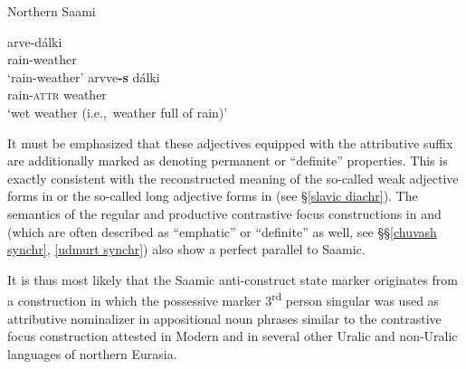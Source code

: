 {%
\begin{exe}
\ex
\begin{xlist}
\ex \rm{Northern Saami \citep[48]{bergsland1976}}
\begin{xlist}
\ex
\gll	arve-dálki\\
	rain-weather\\
\glt	‘rain-weather’
\ex
\gll	arvve\textbf{-s} dálki\\
	rain-\textsc{attr} weather\\
\glt	‘wet weather (i.e.,~weather full of rain)’
\end{xlist}
\end{xlist}
\end{exe}
It must be emphasized that these adjectives equipped with the attributive suffix are additionally marked as denoting permanent or “definite” properties. This is exactly consistent with the reconstructed meaning of the so-called weak adjective forms in  or the so-called long adjective forms in  (see \S\ref{slavic diachr}). The semantics of the regular and productive contrastive focus constructions in  and  (which are often described as “emphatic” or “definite” as well, see \S\S\ref{chuvash synchr}, \ref{udmurt synchr}) also show a perfect parallel to Saamic.

It is thus most likely that the Saamic anti\hyp{}construct state marker originates from a construction in which the possessive marker 3\textsuperscript{rd} person singular was used as attributive nominalizer in appositional noun phrases similar to the contrastive focus construction attested in Modern  and in several other Uralic and non-Uralic languages of northern Eurasia.

}
